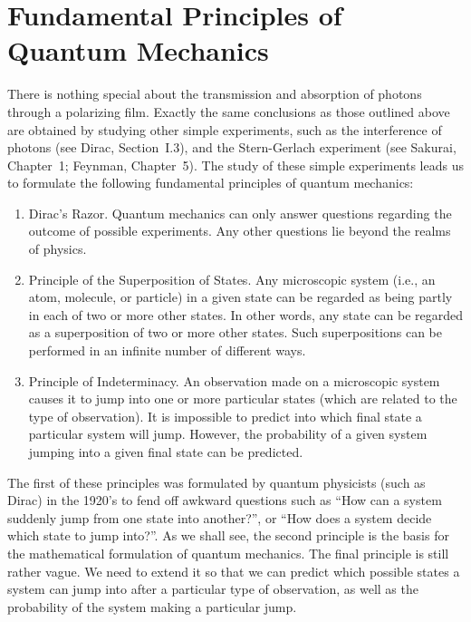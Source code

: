\section{Fundamental Principles of Quantum Mechanics}
There is nothing special about the transmission and absorption of photons
through a polarizing film. Exactly the same conclusions as those outlined above
are obtained by studying other simple experiments, such as the interference of photons
(see Dirac, Section~I.3), and the Stern-Gerlach experiment (see Sakurai,  
Chapter~1; Feynman, Chapter~5). The study of
these simple experiments leads us to formulate the following fundamental principles of
quantum mechanics:
\begin{enumerate}

\item {\sf Dirac's Razor.} Quantum mechanics can only answer questions regarding the
outcome of possible experiments. Any other questions lie beyond the realms of
physics.

\item {\sf Principle of the Superposition of States.} Any  microscopic
system ({\rm i.e.}, an atom, molecule, or particle)  in a given state can be regarded
as being partly in each of two or more other states. In other words, any state
can be regarded as a superposition of two or more other states. Such superpositions can be performed in an infinite number
of different ways.

\item {\sf Principle of Indeterminacy.} An observation made on a 
microscopic system causes it
to jump into one or more particular states (which are related to the type
of observation). It is impossible to predict into which final 
state a particular system
will jump. However, the probability of a given  system jumping into a given final
state can be predicted. 
\end{enumerate}
The first of these principles was formulated by quantum physicists (such as Dirac)
in the 1920's
 to fend off awkward questions such as ``How can a system suddenly
jump from one state into another?'', 
or ``How does a system decide which state to
jump into?''. As we shall see, the second principle is
the basis for the mathematical formulation of quantum mechanics.
The final principle is still rather vague. We need to extend it 
so that we can predict which possible states  a system can jump into after
a particular type of observation, as well as the probability of
the system making a particular jump.

